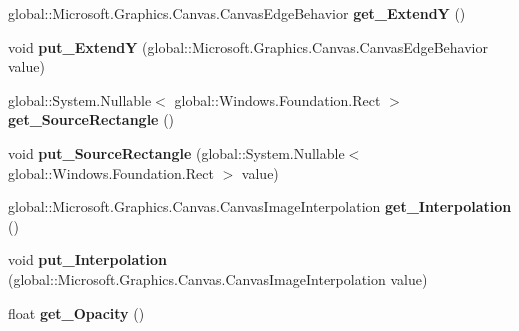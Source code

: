 \begin{DoxyCompactItemize}
global\+::\+Microsoft.\+Graphics.\+Canvas.\+Canvas\+Edge\+Behavior {\bfseries get\+\_\+\+ExtendY} ()
\item 
\mbox{\label{class_microsoft_1_1_graphics_1_1_canvas_1_1_brushes_1_1_canvas_image_brush_a74ff40530cc12913c1a2aed1c6a29603}} 
void {\bfseries put\+\_\+\+ExtendY} (global\+::\+Microsoft.\+Graphics.\+Canvas.\+Canvas\+Edge\+Behavior value)
\item 
\mbox{\label{class_microsoft_1_1_graphics_1_1_canvas_1_1_brushes_1_1_canvas_image_brush_a026484de4f62a1ee93a4dbe3b556bc35}} 
global\+::\+System.\+Nullable$<$ global\+::\+Windows.\+Foundation.\+Rect $>$ {\bfseries get\+\_\+\+Source\+Rectangle} ()
\item 
\mbox{\label{class_microsoft_1_1_graphics_1_1_canvas_1_1_brushes_1_1_canvas_image_brush_a06ce9ecc2a14f31cc237bf4f1d636c3b}} 
void {\bfseries put\+\_\+\+Source\+Rectangle} (global\+::\+System.\+Nullable$<$ global\+::\+Windows.\+Foundation.\+Rect $>$ value)
\item 
\mbox{\label{class_microsoft_1_1_graphics_1_1_canvas_1_1_brushes_1_1_canvas_image_brush_aa876d16918c915a266a3e9223dc1d6d3}} 
global\+::\+Microsoft.\+Graphics.\+Canvas.\+Canvas\+Image\+Interpolation {\bfseries get\+\_\+\+Interpolation} ()
\item 
\mbox{\label{class_microsoft_1_1_graphics_1_1_canvas_1_1_brushes_1_1_canvas_image_brush_a733530cfb4590949e1eddf304a9e861f}} 
void {\bfseries put\+\_\+\+Interpolation} (global\+::\+Microsoft.\+Graphics.\+Canvas.\+Canvas\+Image\+Interpolation value)
\item 
\mbox{\label{class_microsoft_1_1_graphics_1_1_canvas_1_1_brushes_1_1_canvas_image_brush_afaed5d2ea1294c742aa83915f761c1de}} 
float {\bfseries get\+\_\+\+Opacity} ()
\item 
\mbox{\label{class_microsoft_1_1_graphics_1_1_canvas_1_1_brushes_1_1_canvas_image_brush_a027949e4f2b38847ed4732614740696b}} 

\end{DoxyCompactItemize}
